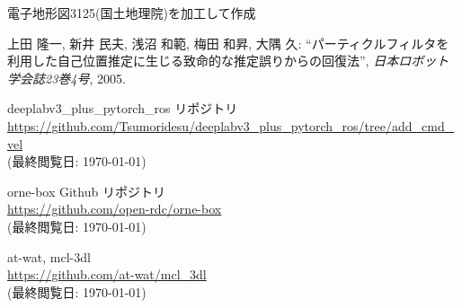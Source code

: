 \documentclass[uplatex, twocolumn, 9pt]{jsproceedings}
\begin{document}
\begin{thebibliography}{99}
電子地形図3125(国土地理院)を加工して作成

上田 隆一, 新井 民夫, 浅沼 和範, 梅田 和昇, 大隅 久: ``パーティクルフィルタを利用した自己位置推定に生じる致命的な推定誤りからの回復法'', \textit{日本ロボット学会誌23巻4号}, 2005.

deeplabv3\_plus\_pytorch\_ros リポジトリ\\
\url{https://github.com/Tsumoridesu/deeplabv3_plus_pytorch_ros/tree/add_cmd_vel}\\
(最終閲覧日: \today)

orne-box Github リポジトリ\\
\url{https://github.com/open-rdc/orne-box}\\
(最終閲覧日: \today)

at-wat, mcl-3dl\\
\url{https://github.com/at-wat/mcl_3dl}\\
(最終閲覧日: \today)

\end{thebibliography}
\normalsize
\end{document}

